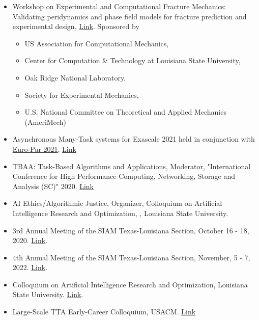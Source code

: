 \documentclass[11pt,a4paper,sans]{moderncv}
\begin{document}
\begin{itemize}[leftmargin=4cm]
\item Workshop on Experimental and Computational Fracture Mechanics:  Validating peridynamics and phase field models for fracture
prediction and experimental design, \href{http://wfm2020.usacm.org/}{Link}. Sponsored by
\begin{itemize}
\item US Association for Computational Mechanics,
\item Center for Computation \& Technology at Louisiana State University, 
\item Oak Ridge National Laboratory,
\item Society for Experimental Mechanics,
\item U.S. National Committee on Theoretical and Applied Mechanics (AmeriMech)
\end{itemize}
\item Asynchronous Many-Task systems for Exascale 2021 held in conjunction with \href{https://2021.euro-par.org/}{Euro-Par 2021}, \href{https://amte2021.stellar-group.org}{Link}
\end{itemize}

\begin{itemize}[leftmargin=4cm]
\item TBAA: Task-Based Algorithms and Applications, Moderator, "International Conference for High Performance Computing, Networking, Storage and Analysis (SC)" 2020. \href{https://stellar-group.org/research/tbaa2020-scpanel/}{Link}
\item AI Ethics/Algorithmic Justice, Organizer, Colloquium on Artificial Intelligence Research and Optimization, , Louisiana State University. 
\end{itemize}


\begin{itemize}[leftmargin=4cm]
\item 3rd Annual Meeting of the SIAM Texas-Louisiana Section, October 16 - 18,  2020. \href{https://www.math.tamu.edu/conferences/SIAMTXLA/}{Link}.
\item 4th Annual Meeting of the SIAM Texas-Louisiana Section,  November,  5 - 7,  2022. \href{https://faculty.utrgv.edu/eleftherios.gkioulekas/2021-siam-txla-meeting-spi/index.html}{Link}.
\end{itemize}

\begin{itemize}[leftmargin=4cm]
\item Colloquium on Artificial Intelligence Research and Optimization, Louisiana State University. \href{https://stellar-group.org/research/distributed-machine-learning/}{Link}.
\item Large-Scale TTA Early-Career Colloquium, USACM. \href{https://unsacm.memberclicks.net/tta--large-scale-structural-systems }{Link}
\end{itemize}
\end{document}
